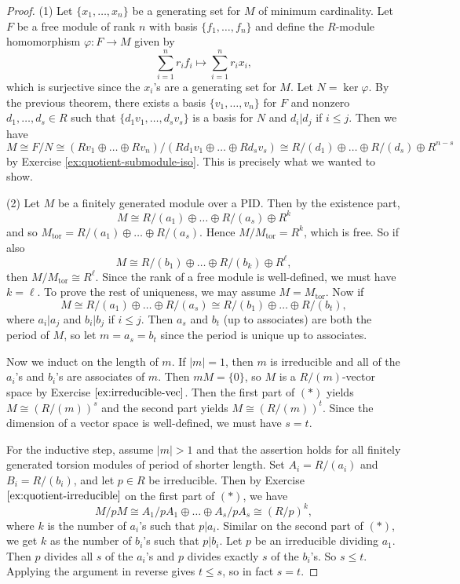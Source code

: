 \begin{proof}
  (1) Let $\{x_1, \dots, x_n\}$ be a generating set for
  $M$ of minimum cardinality. Let $F$ be a free module of
  rank $n$ with basis $\{f_1, \dots, f_n\}$ and
  define the $R$-module homomorphism $\varphi : F \to M$
  given by
  \[
    \sum_{i = 1}^n r_i f_i \mapsto \sum_{i = 1}^n r_i x_i,
  \]
  which is surjective since the $x_i$'s are a generating
  set for $M$. Let $N = \ker \varphi$. By the previous
  theorem, there exists a basis $\{v_1, \dots, v_n\}$
  for $F$ and nonzero $d_1, \dots, d_s \in R$ such that
  $\{d_1 v_1, \dots, d_s v_s\}$ is a basis for $N$ and
  $d_i | d_j$ if $i \le j$. Then we have
  \[
    M \cong F / N \cong (Rv_1 \oplus \dots \oplus Rv_n) / (Rd_1 v_1 \oplus \dots \oplus Rd_s v_s)
    \cong R / (d_1) \oplus \dots \oplus R / (d_s) \oplus R^{n - s}
  \]
  by Exercise \ref{ex:quotient-submodule-iso}.
  This is precisely what we wanted to show.

  (2) Let $M$ be a finitely generated module over a PID.
  Then by the existence part,
  \[
    M \cong R / (a_1) \oplus \dots \oplus R / (a_s) \oplus R^k
  \]
  and so $M_{\mathrm{tor}} = R / (a_1) \oplus \dots \oplus R / (a_s)$.
  Hence $M / M_{\mathrm{tor}} = R^k$, which is free. So
  if also
  \[
    M \cong R / (b_1) \oplus \dots \oplus R / (b_k) \oplus R^\ell,
  \]
  then $M / M_{\mathrm{tor}} \cong R^\ell$. Since the
  rank of a free module is well-defined, we must have $k = \ell$.
  To prove the rest of uniqueness, we may assume
  $M = M_{\mathrm{tor}}$. Now if
  \[
    M \cong R / (a_1) \oplus \dots \oplus R / (a_s)
    \cong R / (b_1) \oplus \dots \oplus R / (b_t), \tag{$*$}
  \]
  where $a_i | a_j$ and $b_i | b_j$ if $i \le j$. Then
  $a_s$ and $b_t$ (up to associates) are both the period of $M$, so
  let $m = a_s = b_t$ since the period is unique up
  to associates.

  Now we induct on the length of
  $m$. If $|m| = 1$, then $m$ is irreducible and all of
  the $a_i$'s and $b_i$'s are associates of $m$. Then
  $mM = \{0\}$, so $M$ is a $R / (m)$-vector space by
  Exercise $\ref{ex:irreducible-vec}$. Then the first part
  of $(*)$ yields $M \cong (R / (m))^s$ and the second
  part yields $M \cong (R / (m))^t$. Since the dimension
  of a vector space is well-defined, we must have
  $s = t$.

  For the inductive step, assume $|m| > 1$ and that
  the assertion holds for all finitely generated
  torsion modules of period of shorter length.
  Set $A_i = R / (a_i)$ and $B_i = R / (b_i)$, and
  let $p \in R$ be irreducible.
  Then by Exercise $\ref{ex:quotient-irreducible}$ on
  the first part of $(*)$, we have
  \[
    M / pM \cong A_1 / pA_1 \oplus \dots \oplus A_s / pA_s
    \cong (R / p)^k,
  \]
  where $k$ is the number of $a_i$'s such that $p | a_i$.
  Similar on the second part of $(*)$, we get
  $k$ as the number of $b_i$'s such that $p | b_i$.
  Let $p$ be an irreducible dividing $a_1$. Then $p$
  divides all $s$ of the $a_i$'s and $p$ divides exactly
  $s$ of the $b_i$'s. So $s \le t$. Applying the
  argument in reverse gives $t \le s$, so in fact
  $s = t$.


\end{proof}
